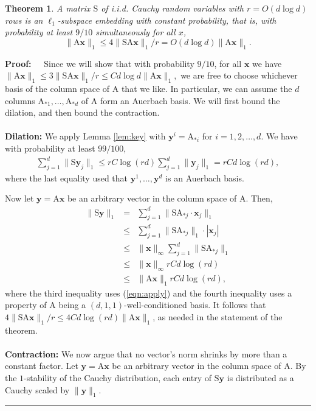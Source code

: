 \documentclass[11pt]{article}
\newtheorem{theorem}{Theorem}
\newenvironment{proof}{\begin{trivlist} \item {\bf Proof:~~}}
  {\qed\end{trivlist}}
\newcommand{\mat}[1]{{\ensuremath{\bm{\mathrm{#1}}}}}
\def\matA{\mat{A}}
\def\matS{\mat{S}}
\def\qed{\hfill\rule{2mm}{2mm}}
\def\x{{\mathbf x}}
\def\y{{\mathbf y}}
\begin{document}
\begin{theorem}\label{thm:l1embed}
A matrix $\matS$ 
of i.i.d. Cauchy random variables with 
$r = O(d \log d)$ rows is an $\ell_1$-subspace embedding with constant probability, that is,
with probability at least $9/10$ simultaneously 
for all $x$, $$\|\matA \x\|_1 \leq 4\|\matS \matA \x\|_1/r = O(d \log d) \|\matA \x\|_1.$$
\end{theorem}
\begin{proof}
Since we will show that with probability $9/10$, for all $\x$ we have 
$\|\matA \x\|_1 \leq 3\|\matS \matA \x\|_1/r \leq C d \log d \|\matA \x\|_1,$ we are free to
choose whichever basis of the column space of $\matA$ that we like. 
In particular, we can assume the $d$ columns $\matA_{*1}, \ldots, \matA_{*d}$ 
of $\matA$ form an Auerbach basis. We will first bound the dilation, and then bound the contraction.
\\\\
{\bf Dilation:}
We apply Lemma \ref{lem:key} with $\y^i = \matA_{*i}$ for $i = 1, 2, \ldots, d$. 
We have with probability at least $99/100$,
\begin{eqnarray}\label{eqn:apply}
\sum_{j=1}^d \|\matS \y_j\|_1 \leq r C \log(rd) \sum_{j=1}^d \|\y_j\|_1 = r C d \log(rd),
\end{eqnarray}
where the last equality used that $\y^1, \ldots, \y^d$ is an Auerbach basis. 

Now let $\y = \matA \x$ be an arbitrary vector in the column space of $\matA$. Then,
\begin{eqnarray*}
\|\matS \y\|_1 & = & \sum_{j=1}^d \|\matS \matA_{*j} \cdot \x_j\|_1\\
& \leq & \sum_{j=1}^d \|\matS \matA_{*j}\|_1 \cdot |\x_j|\\
& \leq & \|\x\|_{\infty} \sum_{j=1}^d \|\matS \matA_{*j}\|_1\\
& \leq & \|\x\|_{\infty} r C d \log(rd)\\ 
& \leq & \|\matA \x\|_1 r C d \log(rd),
\end{eqnarray*}
where the third inequality uses (\ref{eqn:apply}) and the fourth inequality uses a property of 
$\matA$ being a $(d,1,1)$-well-conditioned 
basis. It follows that $4\|\matS \matA \x\|_1/r \leq 4C d \log(rd) \|\matA \x\|_1$, as needed in the statement of the theorem.
\\\\
{\bf Contraction:} 
We now argue that no vector's norm shrinks by more than a constant factor. 
Let $\y = \matA \x$ be an arbitrary vector in the column space of $\matA$. By the $1$-stability of the Cauchy distribution, 
each entry of $\matS \y$ is distributed as a Cauchy scaled by $\|\y\|_1$. 


\end{proof}
\end{document}
